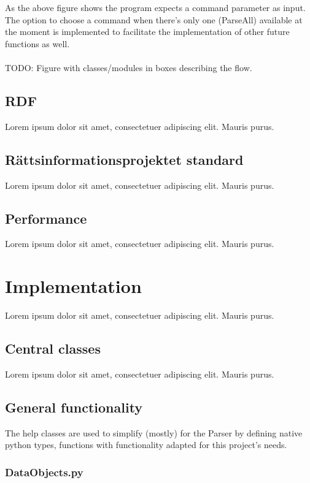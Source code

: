 \documentclass[a4paper,11pt]{kth-mag}
\begin{document}
As the above figure shows the program expects a command parameter as input. The option to choose a command when there’s only one (ParseAll) available at the moment is implemented to facilitate the implementation of other future functions as well.\\\\
TODO: Figure with classes/modules in boxes describing the flow. 

\section{RDF}

Lorem ipsum dolor sit amet, consectetuer adipiscing elit. Mauris
purus.

\section{Rättsinformationsprojektet standard}

Lorem ipsum dolor sit amet, consectetuer adipiscing elit. Mauris
purus.  

\section{Performance}

Lorem ipsum dolor sit amet, consectetuer adipiscing elit. Mauris
purus. 

\chapter{Implementation}

Lorem ipsum dolor sit amet, consectetuer adipiscing elit. Mauris
purus. 

\section{Central classes}

Lorem ipsum dolor sit amet, consectetuer adipiscing elit. Mauris
purus. 

\section{General functionality}

The help classes are used to simplify (mostly) for the Parser by defining native python types, functions with functionality adapted for this project's needs.  

\subsection{DataObjects.py}
\end{document}
